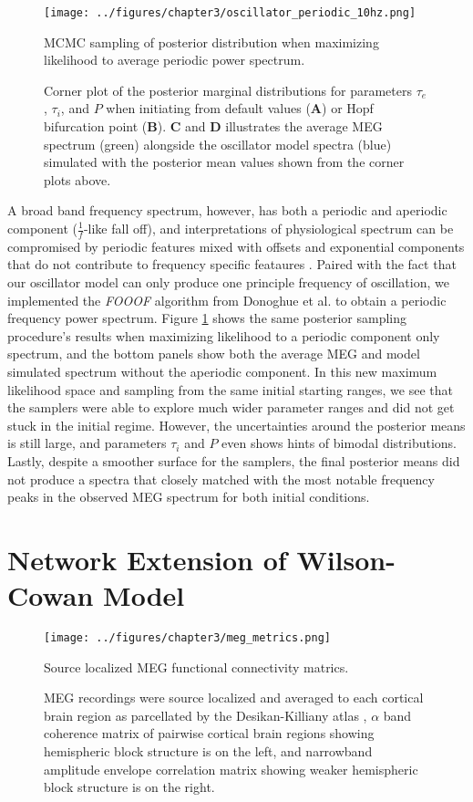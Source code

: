 \begin{figure}
    \centering
    \texttt{[image: ../figures/chapter3/oscillator\_periodic\_10hz.png]}
   \caption{MCMC sampling of posterior distribution when maximizing likelihood to average periodic power spectrum.}
    \caption*{Corner plot of the posterior marginal distributions for parameters $\tau_e$, $\tau_i$, and $P$ when initiating from default values (\textbf{A}) or Hopf bifurcation point (\textbf{B}). \textbf{C} and \textbf{D} illustrates the average MEG spectrum (green) alongside the oscillator model spectra (blue) simulated with the posterior mean values shown from the corner plots above.}
    \label{fig:oscillator_periodic}
\end{figure}

A broad band frequency spectrum, however, has both a periodic and aperiodic component ($\frac{1}{f}$-like fall off), and interpretations of physiological spectrum can be compromised by periodic features mixed with offsets and exponential components that do not contribute to frequency specific feataures \cite{donoghue_parameterizing_2020}. Paired with the fact that our oscillator model can only produce one principle frequency of oscillation, we implemented the \emph{FOOOF} algorithm from Donoghue et al. \cite{donoghue_parameterizing_2020} to obtain a periodic frequency power spectrum. Figure \ref{fig:oscillator_periodic} shows the same posterior sampling procedure's results when maximizing likelihood to a periodic component only spectrum, and the bottom panels show both the average MEG and model simulated spectrum without the aperiodic component. In this new maximum likelihood space and sampling from the same initial starting ranges, we see that the samplers were able to explore much wider parameter ranges and did not get stuck in the initial regime. However, the uncertainties around the posterior means is still large, and parameters $\tau_i$ and $P$ even shows hints of bimodal distributions. Lastly, despite a smoother surface for the samplers, the final posterior means did not produce a spectra that closely matched with the most notable frequency peaks in the observed MEG spectrum for both initial conditions. 

\section{Network Extension of Wilson-Cowan Model}

\begin{figure}
    \centering
    \texttt{[image: ../figures/chapter3/meg\_metrics.png]}
   \caption{Source localized MEG functional connectivity matrics.}
    \caption*{MEG recordings were source localized and averaged to each cortical brain region as parcellated by the Desikan-Killiany atlas \cite{Desikan2006}, $\alpha$ band coherence matrix of pairwise cortical brain regions showing hemispheric block structure is on the left, and narrowband amplitude envelope correlation matrix showing weaker hemispheric block structure is on the right.}
    \label{fig:meg_metrics}
\end{figure}

